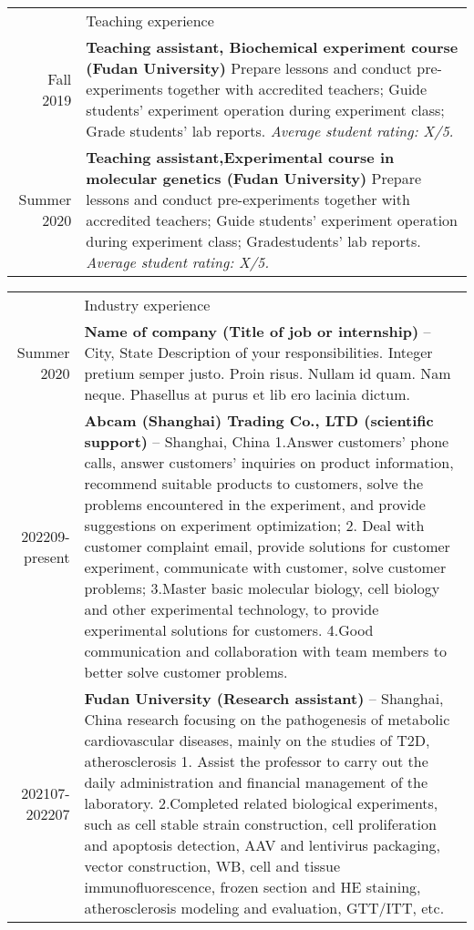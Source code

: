 \documentclass[letterpaper, 11pt]{article}
\newcommand{\headingfont}{\Large\color{OliveGreen}}
\newenvironment{SectionTable}[1]{
	\renewcommand*{\arraystretch}{1.7}
	\setlength{\tabcolsep}{10pt}
	\begin{longtable}{Rp{5.2in}} & #1 \\}
{\end{longtable}\vspace{-.3cm}}
\begin{document}

\begin{SectionTable}{\headingfont Teaching experience}
Fall 2019 & 
\textbf{Teaching assistant, Biochemical experiment course (Fudan University)} \newline
Prepare lessons and conduct pre-experiments together with accredited teachers; Guide students' experiment operation during experiment class; Grade students' lab reports. \newline
\textit{Average student rating: X/5.} \\

Summer  2020 & 
\textbf{Teaching assistant,Experimental course in molecular genetics (Fudan University)} \newline
Prepare lessons and conduct pre-experiments together with accredited teachers; Guide students' experiment operation during experiment class; Gradestudents' lab reports. \newline
\textit{Average student rating: X/5.}
\end{SectionTable}


\begin{SectionTable}{\headingfont Industry experience}
Summer 2020 &
\textbf{Name of company (Title of job or internship)} -- City, State \newline
Description of your responsibilities. Integer pretium semper justo. Proin risus. Nullam id quam. Nam neque. Phasellus at purus et lib ero lacinia dictum.  \\

202209-present &
\textbf{Abcam (Shanghai) Trading Co., LTD (scientific support)} -- Shanghai, China \newline
1.Answer customers' phone calls, answer customers' inquiries on product information, recommend suitable products to customers, solve the problems encountered in the experiment, and provide suggestions on experiment optimization;
2. Deal with customer complaint email, provide solutions for customer experiment, communicate with customer, solve customer problems;
3.Master basic molecular biology, cell biology and other experimental technology, to provide experimental solutions for customers.
4.Good communication and collaboration with team members to better solve customer problems. \\

202107-202207 &
\textbf{Fudan University  (Research assistant)} -- Shanghai, China \newline
research focusing on the pathogenesis of metabolic cardiovascular diseases, mainly on the studies of T2D, atherosclerosis 
1. Assist the professor to carry out the daily administration and financial management of the laboratory.
2.Completed related biological experiments, such as cell stable strain construction, cell proliferation and apoptosis detection, AAV and lentivirus packaging, vector construction, WB, cell and tissue immunofluorescence, frozen section and HE staining, atherosclerosis modeling and evaluation, GTT/ITT, etc.
 \\
\end{SectionTable}
\end{document}
